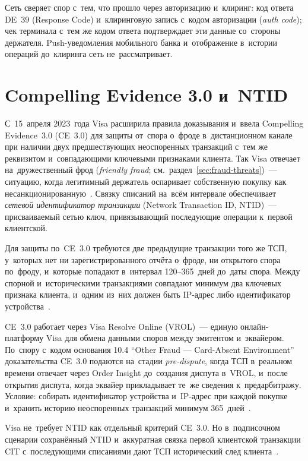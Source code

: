 Сеть сверяет спор с~тем, что прошло через авторизацию и~клиринг: код ответа
DE~39 (Response Code) и~клиринговую запись с~кодом авторизации
(\textit{auth code}); чек терминала с~тем же кодом ответа подтверждает
эти данные со~стороны держателя. Push-уведомления мобильного банка
и~отображение в~истории операций до~клиринга сеть не~рассматривает.

\section{Compelling Evidence 3.0 и~NTID}\label{sec:disputes-ce30}

С~15~апреля 2023~года Visa расширила правила доказывания и~ввела Compelling
Evidence~3.0 (CE~3.0) для защиты от~спора о~фроде в~дистанционном
канале при наличии двух предшествующих неоспоренных транзакций с~тем же
реквизитом и~совпадающими ключевыми признаками клиента. Так Visa отвечает
на~дружественный фрод (\textit{friendly fraud};
см.~раздел~\ref{sec:fraud-threats})~--- ситуацию, когда легитимный держатель
оспаривает собственную покупку как
несанкционированную~\cite{visa-ce30-merchant-readiness,visa-core-rules}. Связку
списаний на~всём интервале обеспечивает \emph{сетевой идентификатор транзакции}
(Network Transaction ID, NTID)~--- присваиваемый сетью ключ, привязывающий
последующие операции к~первой клиентской.

Для защиты по~CE~3.0 требуются две предыдущие транзакции того же ТСП, у~которых
нет ни зарегистрированного отчёта о~фроде, ни открытого спора по~фроду, и~которые
попадают в~интервал 120--365~дней до~даты спора. Между спорной
и~историческими транзакциями совпадают минимум два ключевых признака клиента,
и~одним из~них должен быть IP-адрес либо идентификатор
устройства~\cite{visa-ce30-merchant-readiness}.

CE~3.0 работает через Visa Resolve Online (VROL)~--- единую онлайн-платформу
Visa для обмена данными споров между эмитентом и~эквайером. По~спору с~кодом
основания 10.4 \enquote{Other Fraud --- Card-Absent Environment} доказательства
CE~3.0 подаются на~стадии \textit{pre-dispute}, когда ТСП в~реальном
времени отвечает через Order Insight до~создания диспута в~VROL, и~после
открытия диспута, когда эквайер прикладывает те~же сведения к~предарбитражу.
Условие: собирать идентификатор устройства и~IP-адрес при каждой покупке
и~хранить историю неоспоренных транзакций
минимум 365~дней~\cite{visa-ce30-merchant-readiness}.

Visa не~требует NTID как отдельный критерий CE~3.0. Но в~подписочном сценарии
сохранённый NTID и~аккуратная связка первой клиентской транзакции CIT
с~последующими списаниями дают ТСП исторический след
клиента~\cite{visa-ce30-merchant-readiness,visa-scf}.

